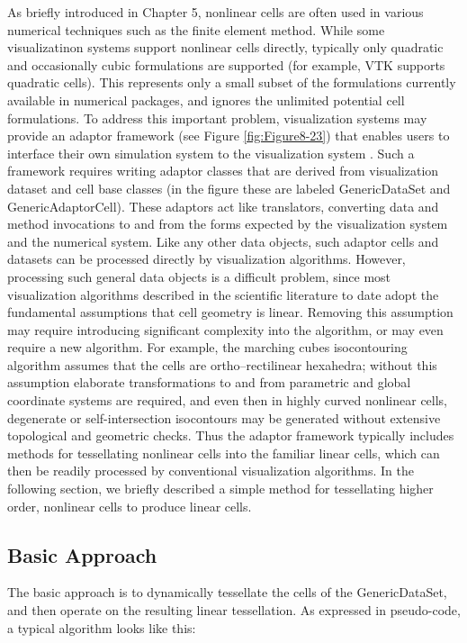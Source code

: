 As briefly introduced in Chapter 5, nonlinear cells are often used in various numerical techniques such as the finite element method. While some visualizatinon systems support nonlinear cells directly, typically only quadratic and occasionally cubic formulations are supported (for example, VTK supports quadratic cells). This represents only a small subset of the formulations currently available in numerical packages, and ignores the unlimited potential cell formulations. To address this important problem, visualization systems may provide an adaptor framework (see Figure \ref{fig:Figure8-23}) that enables users to interface their own simulation system to the visualization system \cite{Schroeder06}. Such a framework requires writing adaptor classes that are derived from visualization dataset and cell base classes (in the figure these are labeled GenericDataSet and GenericAdaptorCell). These adaptors act like translators, converting data and method invocations to and from the forms expected by the visualization system and the numerical system. Like any other data objects, such adaptor cells and datasets can be processed directly by visualization algorithms. However, processing such general data objects is a difficult problem, since most visualization algorithms described in the scientific literature to date adopt the fundamental assumptions that cell geometry is linear. Removing this assumption may require introducing significant complexity into the algorithm, or may even require a new algorithm. For example, the marching cubes isocontouring algorithm assumes that the cells are ortho--rectilinear hexahedra; without this assumption elaborate transformations to and from parametric and global coordinate systems are required, and even then in highly curved nonlinear cells, degenerate or self-intersection isocontours may be generated without extensive topological and geometric checks. Thus the adaptor framework typically includes methods for tessellating nonlinear cells into the familiar linear cells, which can then be readily processed by conventional visualization algorithms. In the following section, we briefly described a simple method for tessellating higher order, nonlinear cells to produce linear cells.

\subsection{Basic Approach}

The basic approach is to dynamically tessellate the cells of the GenericDataSet, and then operate on the resulting linear tessellation. As expressed in pseudo-code, a typical algorithm looks like this:


